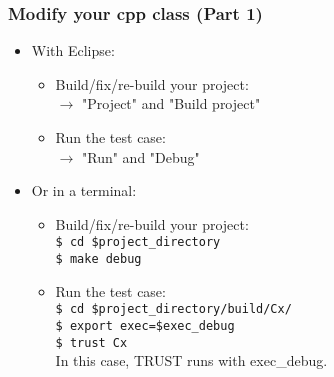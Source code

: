 \documentclass[10pt, hyperref={unicode=true,pdfusetitle, bookmarks=true,bookmarksnumbered=false,bookmarksopen=false, breaklinks=false,pdfborder={0 0 1},backref=true,colorlinks=true,linkcolor=darkblue,pageanchor, urlcolor=darkblue}]{beamer}
\begin{document}
\begin{frame}
\frametitle{Modify your cpp class (Part 1)}

\begin{block}{}
\begin{itemize}
\item With Eclipse:

    \begin{itemize}
    \item Build/fix/re-build your project:\\
    $\rightarrow$ "Project" and "Build project"\\
    \item Run the test case:\\
    $\rightarrow$ "Run" and "Debug"\\
    \end{itemize}


\item Or in a terminal:
    \begin{itemize}
    \item Build/fix/re-build your project:\\
    \texttt{\$ cd \$project\_directory}\\
    \texttt{\$ make debug}\\
    \item Run the test case:\\
    \texttt{\$ cd \$project\_directory/build/Cx/}\\
    \texttt{\$ export exec=\$exec\_debug}\\
    \texttt{\$ trust Cx} \\
    In this case, TRUST runs with exec\_debug.
    \end{itemize}
\end{itemize}
\end{block}

\end{frame}
\end{document}
